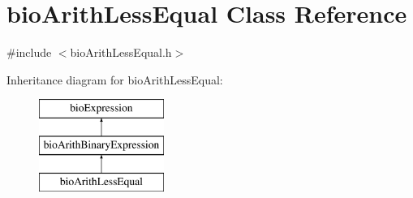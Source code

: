 \hypertarget{classbio_arith_less_equal}{}\section{bio\+Arith\+Less\+Equal Class Reference}
\label{classbio_arith_less_equal}


{\ttfamily \#include $<$bio\+Arith\+Less\+Equal.\+h$>$}

Inheritance diagram for bio\+Arith\+Less\+Equal\+:\begin{figure}[H]
\begin{center}
\leavevmode
\includegraphics[height=3.000000cm]{classbio_arith_less_equal}
\end{center}
\end{figure}
